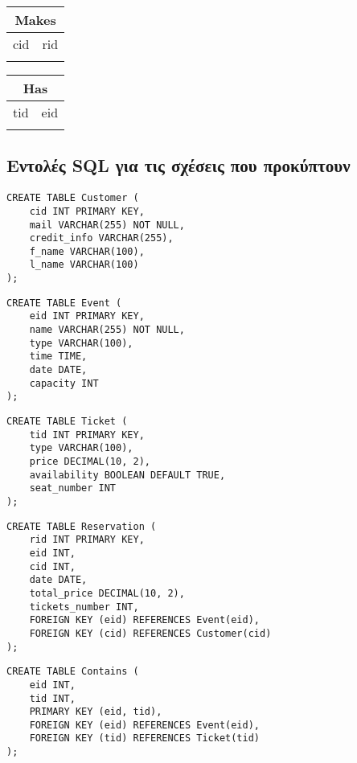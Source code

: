 \documentclass{article}
\begin{document}
\vspace{5pt}

\noindent
\begin{tabular}{|c|c|}
\hline
\multicolumn{2}{|c|}{Makes} \\
\hline
cid & rid \\
\hline
& \\
\hline
\end{tabular}

\vspace{5pt}

\noindent
\begin{tabular}{|c|c|}
\hline
\multicolumn{2}{|c|}{Has} \\
\hline
tid & eid \\
\hline
& \\
\hline
\end{tabular}

\subsection*{Εντολές SQL για τις σχέσεις που προκύπτουν}
\begin{lstlisting}
CREATE TABLE Customer (
    cid INT PRIMARY KEY,
    mail VARCHAR(255) NOT NULL,
    credit_info VARCHAR(255),
    f_name VARCHAR(100),
    l_name VARCHAR(100)
);
\end{lstlisting}

\begin{lstlisting}
CREATE TABLE Event (
    eid INT PRIMARY KEY,
    name VARCHAR(255) NOT NULL,
    type VARCHAR(100),
    time TIME,
    date DATE,
    capacity INT
);
\end{lstlisting}

\begin{lstlisting}
CREATE TABLE Ticket (
    tid INT PRIMARY KEY,
    type VARCHAR(100),
    price DECIMAL(10, 2),
    availability BOOLEAN DEFAULT TRUE,
    seat_number INT
);
\end{lstlisting}

\begin{lstlisting}
CREATE TABLE Reservation (
    rid INT PRIMARY KEY,
    eid INT,
    cid INT,
    date DATE,
    total_price DECIMAL(10, 2),
    tickets_number INT,
    FOREIGN KEY (eid) REFERENCES Event(eid),
    FOREIGN KEY (cid) REFERENCES Customer(cid)
);
\end{lstlisting}

\begin{lstlisting}
CREATE TABLE Contains (
    eid INT,
    tid INT,
    PRIMARY KEY (eid, tid),
    FOREIGN KEY (eid) REFERENCES Event(eid),
    FOREIGN KEY (tid) REFERENCES Ticket(tid)
);
\end{lstlisting}
\end{document}
